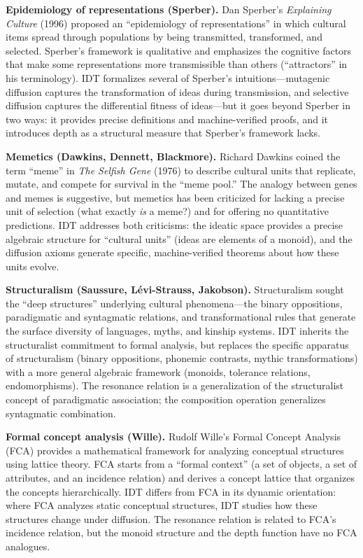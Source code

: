 \documentclass[11pt,openany]{book}
\theoremstyle{definition}
\theoremstyle{plain}
\theoremstyle{remark}
\begin{document}
\textbf{Epidemiology of representations (Sperber).} Dan Sperber's \emph{Explaining Culture} (1996) proposed an ``epidemiology of representations'' in which cultural items spread through populations by being transmitted, transformed, and selected. Sperber's framework is qualitative and emphasizes the cognitive factors that make some representations more transmissible than others (``attractors'' in his terminology). IDT formalizes several of Sperber's intuitions---mutagenic diffusion captures the transformation of ideas during transmission, and selective diffusion captures the differential fitness of ideas---but it goes beyond Sperber in two ways: it provides precise definitions and machine-verified proofs, and it introduces depth as a structural measure that Sperber's framework lacks.

\textbf{Memetics (Dawkins, Dennett, Blackmore).} Richard Dawkins coined the term ``meme'' in \emph{The Selfish Gene} (1976) to describe cultural units that replicate, mutate, and compete for survival in the ``meme pool.'' The analogy between genes and memes is suggestive, but memetics has been criticized for lacking a precise unit of selection (what exactly \emph{is} a meme?) and for offering no quantitative predictions. IDT addresses both criticisms: the ideatic space provides a precise algebraic structure for ``cultural units'' (ideas are elements of a monoid), and the diffusion axioms generate specific, machine-verified theorems about how these units evolve.

\textbf{Structuralism (Saussure, L\'evi-Strauss, Jakobson).} Structuralism sought the ``deep structures'' underlying cultural phenomena---the binary oppositions, paradigmatic and syntagmatic relations, and transformational rules that generate the surface diversity of languages, myths, and kinship systems. IDT inherits the structuralist commitment to formal analysis, but replaces the specific apparatus of structuralism (binary oppositions, phonemic contrasts, mythic transformations) with a more general algebraic framework (monoids, tolerance relations, endomorphisms). The resonance relation is a generalization of the structuralist concept of paradigmatic association; the composition operation generalizes syntagmatic combination.

\textbf{Formal concept analysis (Wille).} Rudolf Wille's Formal Concept Analysis (FCA) provides a mathematical framework for analyzing conceptual structures using lattice theory. FCA starts from a ``formal context'' (a set of objects, a set of attributes, and an incidence relation) and derives a concept lattice that organizes the concepts hierarchically. IDT differs from FCA in its dynamic orientation: where FCA analyzes static conceptual structures, IDT studies how these structures change under diffusion. The resonance relation is related to FCA's incidence relation, but the monoid structure and the depth function have no FCA analogues.
\end{document}
